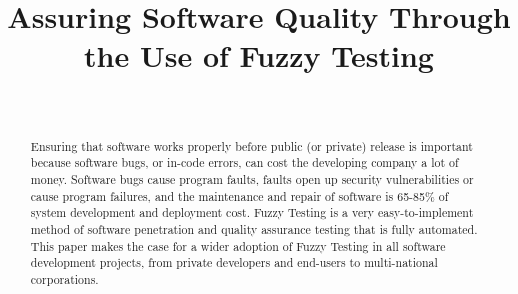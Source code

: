 \documentclass[10pt, final, journal, letterpaper, twoside, twocolumn]{IEEEtran}
\begin{document}
\title{Assuring Software Quality Through the Use of Fuzzy Testing}
\author{ \\
	}

\maketitle


\begin{abstract}
	Ensuring that software works properly before public (or private) release is important because software bugs, or in-code errors, can cost the developing company a lot of money. Software bugs cause program faults, faults open up security vulnerabilities or cause program failures, and the maintenance and repair of software is 65-85\% of system development and deployment cost. Fuzzy Testing is a very easy-to-implement method of software penetration and quality assurance testing that is fully automated. This paper makes the case for a wider adoption of Fuzzy Testing in all software development projects, from private developers and end-users to multi-national corporations.
	

\end{abstract}
\end{document}
